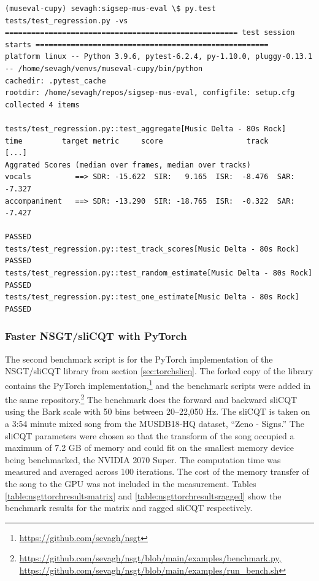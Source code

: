 \documentclass[report.tex]{subfiles}
\begin{document}
\begin{listing}[h]
  \centering
\begin{verbatim}
(museval-cupy) sevagh:sigsep-mus-eval \$ py.test tests/test_regression.py -vs
===================================================== test session starts =====================================================
platform linux -- Python 3.9.6, pytest-6.2.4, py-1.10.0, pluggy-0.13.1 -- /home/sevagh/venvs/museval-cupy/bin/python
cachedir: .pytest_cache
rootdir: /home/sevagh/repos/sigsep-mus-eval, configfile: setup.cfg
collected 4 items

tests/test_regression.py::test_aggregate[Music Delta - 80s Rock]     time         target metric     score                   track
[...]
Aggrated Scores (median over frames, median over tracks)
vocals          ==> SDR: -15.622  SIR:   9.165  ISR:  -8.476  SAR:  -7.327
accompaniment   ==> SDR: -13.290  SIR: -18.765  ISR:  -0.322  SAR:  -7.427

PASSED
tests/test_regression.py::test_track_scores[Music Delta - 80s Rock] PASSED
tests/test_regression.py::test_random_estimate[Music Delta - 80s Rock] PASSED
tests/test_regression.py::test_one_estimate[Music Delta - 80s Rock] PASSED
\end{verbatim}
  \caption{Passing regression test output for the CuPy GPU speedup}
  \label{lst:regressionout}
\end{listing}

\newpagefill

\subsubsection{Faster NSGT/sliCQT with PyTorch}

The second benchmark script is for the PyTorch implementation of the NSGT/sliCQT library from section \ref{sec:torchslicq}. The forked copy of the library contains the PyTorch implementation,\footnote{\url{https://github.com/sevagh/nsgt}} and the benchmark scripts were added in the same repository.\footnote{\url{https://github.com/sevagh/nsgt/blob/main/examples/benchmark.py, https://github.com/sevagh/nsgt/blob/main/examples/run_bench.sh}} The benchmark does the forward and backward sliCQT using the Bark scale with 50 bins between 20--22,050 Hz. The sliCQT is taken on a 3:54 minute mixed song from the MUSDB18-HQ dataset, ``Zeno - Signs.'' The sliCQT parameters were chosen so that the transform of the song occupied a maximum of 7.2 GB of memory and could fit on the smallest memory device being benchmarked, the NVIDIA 2070 Super. The computation time was measured and averaged across 100 iterations. The cost of the memory transfer of the song to the GPU was not included in the measurement. Tables \ref{table:nsgttorchresultsmatrix} and \ref{table:nsgttorchresultsragged} show the benchmark results for the matrix and ragged sliCQT respectively.
\end{document}
